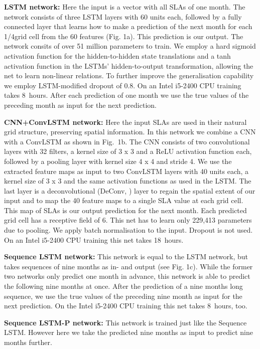 \documentclass{article}
\begin{document}
{\bf LSTM network:} 
Here the input is a vector with all SLAs of one month. The network consists of three LSTM layers with 60 units each, followed by a fully connected layer that learns how to make a prediction of the next month for each 1/4\degree grid cell from the 60 features (Fig. 1a). This prediction is our output. The network consits of over 51 million parameters to train. We employ a hard sigmoid activation function for the hidden-to-hidden state translations and a tanh activation function in the LSTMs' hidden-to-output transformation, allowing the net to learn non-linear relations. To further improve the generalisation capability we employ LSTM-modified dropout \cite{rnndrop} of 0.8. On an Intel i5-2400 CPU training takes 8~hours. After each prediction of one month we use the true values of the preceding month as input for the next prediction. 

{\bf CNN+ConvLSTM network:} Here the input SLAs are used in their natural grid structure, preserving spatial information. In this network we combine a CNN with a ConvLSTM as shown in Fig.~1b. The CNN consists of two convolutional layers with 32 filters, a kernel size of 3 x 3 and a ReLU activation function each, followed by a pooling layer with kernel size 4 x 4 and stride 4. 
We use the extracted feature maps as input to
two ConvLSTM layers with 40 units each, a kernel size of 3 x 3 and the same activation functions as used in the LSTM. 
The last layer is a deconvolutional (DeConv, \cite{deconv}) layer to regain the spatial extent of our input and to map the 40 feature maps to a single SLA value at each grid cell. This map of SLAs is our output prediction for the next month. Each predicted grid cell has a receptive field of 6\degree. This net has to learn only 229,413 parameters due to pooling. We apply batch normalisation to the input. Dropout is not used. On an Intel i5-2400 CPU training this net takes 18~hours.

{\bf Sequence LSTM network:} 
This network is equal to the LSTM network, but takes sequences of nine months as in- and output (see Fig. 1c). While the former two networks only predict one month in advance, this network is able to predict the following nine months at once. After the prediction of a nine months long sequence, we use the true values of the preceding nine month as input for the next prediction. On the Intel i5-2400 CPU training this net takes 8~hours, too. 


{\bf Sequence LSTM-P network:} This network is trained just like the Sequence LSTM. However here we take the predicted nine months as input to predict nine months further.
\end{document}
